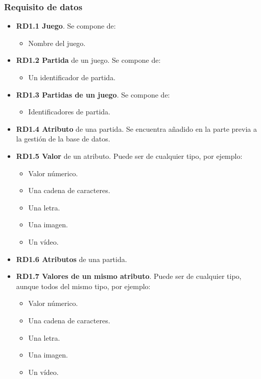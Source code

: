 \subsubsection{Requisito de datos}

\begin{itemize}
	\item \textbf{RD1.1 Juego}. Se compone de:
	\begin{itemize}
		\item Nombre del juego.
	\end{itemize}
	
	\item \textbf{RD1.2 Partida} de un juego.  Se compone de:
	\begin{itemize}
		\item Un identificador de partida.
	\end{itemize}
	
	\item \textbf{RD1.3 Partidas de un juego}. Se compone de:
	\begin{itemize}
		\item Identificadores de partida.
	\end{itemize}
	
	\item \textbf{RD1.4 Atributo} de una partida. Se encuentra añadido en la parte previa a la gestión de la base de datos.
	
	\item \textbf{RD1.5 Valor} de un atributo. Puede ser de cualquier tipo, por ejemplo:
	\begin{itemize}
		\item Valor númerico.
		\item Una cadena de caracteres.
		\item Una letra.
		\item Una imagen.
		\item Un vídeo.
	\end{itemize}
	
	\item \textbf{RD1.6 Atributos} de una partida.
	
	\item \textbf{RD1.7 Valores de un mismo atributo}. Puede ser de cualquier tipo, aunque todos del mismo tipo, por ejemplo:
	\begin{itemize}
		\item Valor númerico.
		\item Una cadena de caracteres.
		\item Una letra.
		\item Una imagen.
		\item Un vídeo.
	\end{itemize}
	

\end{itemize}
